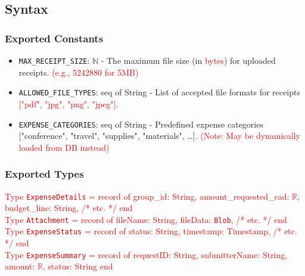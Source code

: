 \documentclass[12pt, titlepage]{article}
\begin{document}
\subsection{Syntax}
\subsubsection{Exported Constants}
\begin{itemize}
    \item \texttt{MAX\_RECEIPT\_SIZE}: $\mathbb{N}$ - The maximum file size (in \textcolor{red}{bytes}) for uploaded receipts. \textcolor{red}{(e.g., 5242880 for 5MB)}
    \item \texttt{ALLOWED\_FILE\_TYPES}: seq of String - List of accepted file formats for receipts \textcolor{red}{["pdf", "jpg", "png", "jpeg"]}.
    \item \texttt{EXPENSE\_CATEGORIES}: seq of String - Predefined expense categories ["conference", "travel", "supplies", "materials", \dots]. \textcolor{red}{(Note: May be dynamically loaded from DB instead)}
\end{itemize}

\subsubsection{Exported Types} %
\textcolor{red}{Type \texttt{ExpenseDetails} = record of group\_id: String, amount\_requested\_cad: $\mathbb{R}$, budget\_line: String, /* etc. */ end} \\
\textcolor{red}{Type \texttt{Attachment} = record of fileName: String, fileData: \texttt{Blob}, /* etc. */ end} \\ %
\textcolor{red}{Type \texttt{ExpenseStatus} = record of status: String, timestamp: Timestamp, /* etc. */ end} \\
\textcolor{red}{Type \texttt{ExpenseSummary} = record of requestID: String, submitterName: String, amount: $\mathbb{R}$, status: String end}
\end{document}

